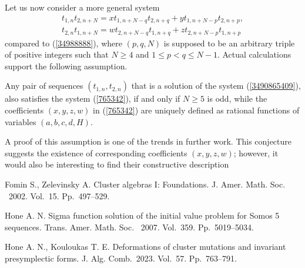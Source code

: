 \documentclass[12pt]{llncs}
\begin{document}
Let us now consider a more general system 
\begin{equation}
\begin{array}{l}
t_{1, n} t_{2, n+N}=x t_{1, n+N-q} t_{2, n+q} + y t_{1, n+N-p} t_{2, n+p}, \\[0.3cm]
t_{2, n} t_{1, n+N}=w t_{2, n+N-q} t_{1, n+q} + z t_{2, n+N-p} t_{1, n+p} 
\end{array}
\label{765342}
\end{equation}
compared to (\ref{34988888}), where $(p, q, N)$ is supposed to be an arbitrary  triple  of positive integers such that $N\geq 4$ and $1\leq p<q\leq N-1$. Actual calculations support the following assumption.
\begin{conjecture}
Any pair of sequences $(t_{1, n}, t_{2, n})$ that is a solution of the system (\ref{3490865409}),  also satisfies the system (\ref{765342}), if and only if $N\geq 5$ is odd, while  the coefficients $(x, y, z, w)$ in  (\ref{765342}) are uniquely defined as rational functions of variables $(a, b, c, d, H)$.
\end{conjecture}
A proof of this assumption is one of the trends in further work. This conjecture suggests the existence of corresponding coefficients $(x, y, z, w)$; however, it would also be interesting to find their constructive description




\begin{thebibliography}{9} %

 Fomin S., Zelevinsky A. Cluster algebras I: Foundations. J. Amer. Math. Soc. ~2002. Vol.~15. Pp.~497--529.


 Hone A. N. Sigma function solution of the initial value problem for Somos 5 sequences. Trans.  Amer. Math. Soc. ~2007. Vol.~359. Pp.~5019--5034.


 Hone A. N., Kouloukas T. E.  Deformations of cluster mutations and invariant presymplectic forms. J. Alg. Comb.~2023. Vol.~57. Pp.~763--791.

\end{thebibliography}
\end{document}

